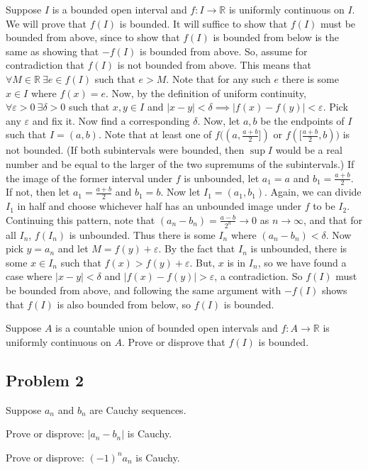 \documentclass[11pt]{article}
\newcommand{\R}{\mathbb{R}}
\begin{document}
Suppose $I$ is a bounded open interval and $f:I\to\R$ is uniformly
continuous on $I$. We will prove that $f(I)$ is bounded. It will
suffice to show that $f(I)$ must be bounded from above, since to show
that $f(I)$ is bounded from below is the same as showing that
$-f(I)$ is bounded from above.
So, assume for contradiction that $f(I)$ is not bounded from above.
This means that $\forall M\in\R\ \exists e\in f(I)$ such that $e>M$.
Note that for any such $e$ there is some $x\in I$ where $f(x)=e$.
Now, by the definition of uniform continuity,
$\forall\varepsilon>0\ \exists\delta>0$ such that
$x,y\in I$ and $|x-y|<\delta\implies|f(x)-f(y)|<\varepsilon$.
Pick any $\varepsilon$ and fix it. Now find a corresponding $\delta$.
Now, let $a,b$ be the endpoints of $I$ such that $I=(a,b)$. Note that
at least one of $f((a,\frac{a+b}{2}])$ or $f([\frac{a+b}{2},b))$ is
not bounded. (If both subintervals were bounded, then $\sup I$ would
be a real number
and be equal to the larger of the two supremums of the subintervals.)
If the image of the former interval under $f$ is unbounded,
let $a_1=a$ and $b_1=\frac{a+b}{2}$.
If not, then let $a_1=\frac{a+b}{2}$ and $b_1=b$. Now let $I_1=(a_1,b_1)$.
Again, we can divide $I_1$ in half and choose whichever half has an unbounded
image under $f$
to be $I_2$. Continuing this pattern, note that $(a_n-b_n)=\frac{a-b}{2^n}\to0$
as $n\to\infty$, and that for all $I_n$, $f(I_n)$ is unbounded.
Thus there is some $I_n$ where $(a_n-b_n)<\delta$. Now pick $y=a_n$ and let
$M=f(y)+\varepsilon$. By the fact that $I_n$ is unbounded, there is some
$x\in I_n$ such that $f(x)>f(y)+\varepsilon$. But, $x$ is in $I_n$,
so we have found a case where $|x-y|<\delta$ and 
$|f(x)-f(y)|>\varepsilon$, a contradiction. So $f(I)$ must be bounded from
above, and following the same argument with $-f(I)$ shows that
$f(I)$ is also bounded from below, so $f(I)$ is bounded.

Suppose $A$ is a countable union of bounded open intervals and $f:A\to\R$
is uniformly continuous on $A$. Prove or disprove that $f(I)$ is bounded.

\subsection*{Problem 2}

Suppose $a_n$ and $b_n$ are Cauchy sequences.

Prove or disprove: $|a_n-b_n|$ is Cauchy.

Prove or disprove: $(-1)^na_n$ is Cauchy.
\end{document}
